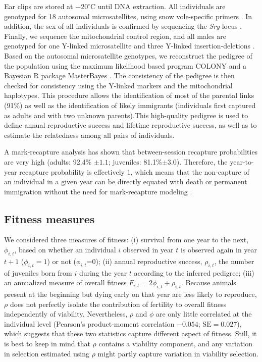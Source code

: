 Ear clips are stored at $-20^\circ$C until DNA extraction. All individuals are genotyped for 18 autosomal microsatellites, using snow vole-specific primers \parencite{Wandeler2008, Garcia-Navas2015}. In addition, the sex of all individuals is confirmed by sequencing the \textit{Sry} locus \parencite{Gubbay1990}. Finally, we sequence the mitochondrial control region, and all males are genotyped for one Y-linked microsatellite and three Y-linked insertion-deletions \parencite{Wandeler2011}.
Based on the autosomal microsatellite genotypes, we reconstruct the pedigree of the population using the maximum likelihood based program COLONY \parencite{Wang2004,Jones2010} and a Bayesian R package MasterBayes \parencite{Hadfield2006,R2016}. The consistency of the pedigree is then checked for consistency using the Y-linked markers and the mitochondrial haplotypes. This procedure allows the identification of most of the parental links (91\%) as well as the identification of likely immigrants (individuals first captured as adults and with two unknown parents).This high-quality pedigree is used to define annual reproductive success and lifetime reproductive success, as well as to estimate the relatedness among all pairs of individuals.

A mark-recapture analysis has shown that between-session recapture probabilities are very high (adults: 92.4\% $\pm1.1$; juveniles: 81.1\%$\pm3.0$). Therefore, the year-to-year recapture probability is effectively 1, which means that the non-capture of an individual in a given year can be directly equated with death or permanent immigration without the need for mark-recapture modeling \parencite{Garcia-Navas2015}.

\subsection*{Fitness measures}
We considered three measures of fitness: (i) survival from one year to the next, $\phi_{i,t}$, based on whether an individual $i$ observed in year $t$ is observed again in year $t+1$ ($\phi_{i,t}=1$) or not ($\phi_{i,t}$=0); (ii) annual reproductive success, $\rho_{i,t}$, the number of juveniles born from $i$ during the year $t$ according to the inferred pedigree; (iii) an annualized measure of overall fitness $F_{i,t}=2\phi_{i,t}+\rho_{i,t}$.
Because animals present at the beginning but dying early on that year are less likely to reproduce, $\rho$ does not perfectly isolate the contribution of fertility to overall fitness independently of viability. Nevertheless, $\rho$ and $\phi$ are only little correlated at the individual level (Pearson's product-moment correlation $-0.054$; $\text{SE}=0.027$), which suggests that these two statistics capture different aspect of fitness. Still, it is best to keep in mind that $\rho$ contains a viability component, and any variation in selection estimated using $\rho$ might  partly capture variation in viability selection.

